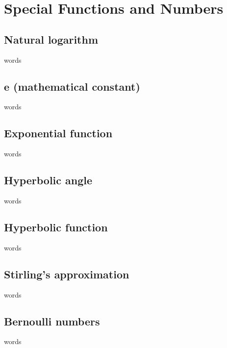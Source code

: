 \chapter{Special Functions and Numbers}


\section{Natural logarithm}
words

\section{e (mathematical constant)}
words

\section{Exponential function}
words

\section{Hyperbolic angle}
words

\section{Hyperbolic function}
words

\section{Stirling's approximation}
words

\section{Bernoulli numbers}
words


